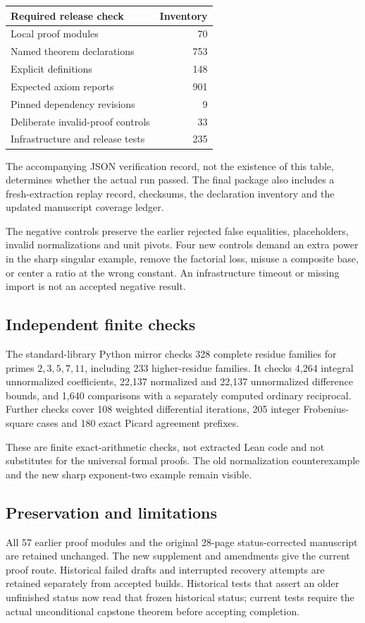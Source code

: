 \begin{center}\begin{tabular}{lr}\toprule
Required release check & Inventory\\\midrule
Local proof modules &70\\
Named theorem declarations &753\\
Explicit definitions &148\\
Expected axiom reports &901\\
Pinned dependency revisions &9\\
Deliberate invalid-proof controls &33\\
Infrastructure and release tests &235\\\bottomrule
\end{tabular}\end{center}
The accompanying JSON verification record, not the existence of this table, determines whether the actual run passed. The final package also includes a fresh-extraction replay record, checksums, the declaration inventory and the updated manuscript coverage ledger.

The negative controls preserve the earlier rejected false equalities, placeholders, invalid normalizations and unit pivots. Four new controls demand an extra power in the sharp singular example, remove the factorial loss, misuse a composite base, or center a ratio at the wrong constant. An infrastructure timeout or missing import is not an accepted negative result.

\subsection*{Independent finite checks}
The standard-library Python mirror checks 328 complete residue families for primes $2,3,5,7,11$, including 233 higher-residue families. It checks 4,264 integral unnormalized coefficients, 22,137 normalized and 22,137 unnormalized difference bounds, and 1,640 comparisons with a separately computed ordinary reciprocal. Further checks cover 108 weighted differential iterations, 205 integer Frobenius-square cases and 180 exact Picard agreement prefixes.

These are finite exact-arithmetic checks, not extracted Lean code and not substitutes for the universal formal proofs. The old normalization counterexample and the new sharp exponent-two example remain visible.

\subsection*{Preservation and limitations}
All 57 earlier proof modules and the original 28-page status-corrected manuscript are retained unchanged. The new supplement and amendments give the current proof route. Historical failed drafts and interrupted recovery attempts are retained separately from accepted builds. Historical tests that assert an older unfinished status now read that frozen historical status; current tests require the actual unconditional capstone theorem before accepting completion.

